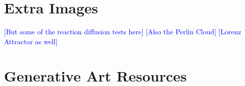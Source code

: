 \documentclass[12pt,twoside]{reedthesis}
\begin{document}
    \appendix
      \chapter{Extra Images}
      \textcolor{blue}{[But some of the reaction diffusion tests here]}
      \textcolor{blue}{[Also the Perlin Cloud]}
      \textcolor{blue}{[Lorenz Attractor as well]}
      \chapter{Generative Art Resources}

\backmatter 
\nocite{*}


 
\end{document}
